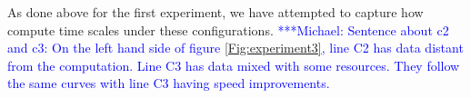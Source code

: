 \documentclass{rspublic}
\newcommand{\micnote}[1]{ {\textcolor{blue} { ***Michael: #1 }}}
\begin{document}
As done above for the first experiment, we have attempted to capture how
compute time scales under these configurations. \micnote{Sentence about
c2 and c3: On the left hand side of figure \ref{Fig:experiment3}, line
C2 has data distant from the computation. Line C3 has data mixed with
some resources. They follow the same curves with line C3 having speed
improvements.} 
\begin{center}
\begin{figure}
\subfigure[Fig. \ref{Fig:experiment4:a} - Fig. \ref{Fig:experiment4:b}, i.e., $\Delta t_c$, $(c_s, N_c, fs, m) = (\mbox{144 MB, 8, CloudStore, Direct})$]

\end{figure}
\end{center}
\end{document}
